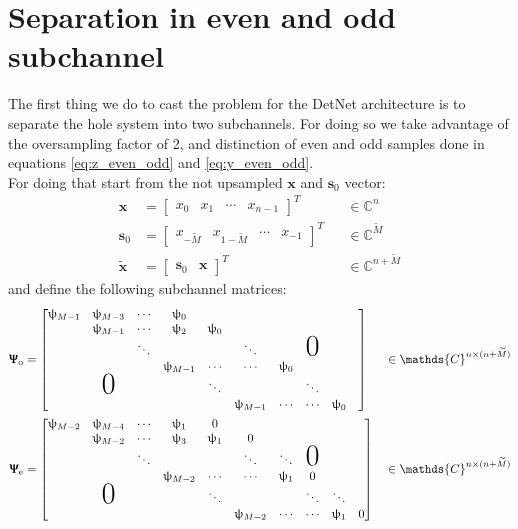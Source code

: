 \section{Separation in even and odd subchannel}

The first thing we do to cast the problem for the DetNet architecture is to separate the hole system into two subchannels. For doing so we take advantage of the oversampling factor of 2, and distinction of even and odd samples done in equations \ref{eq:z_even_odd} and \ref{eq:y_even_odd}.\\

For doing that start from the not upsampled $\bm x$ and $\bm s_0$ vector: 
\begin{align}
	\bm x &= \begin{bmatrix}x_0&x_1&\cdots& x_{n-1}\end{bmatrix}^T && \in \mathds{C}^{n}\\
	\bm{s}_0&=\begin{bmatrix}x_{-\widetilde{M}}&x_{1-\widetilde{M}}&\cdots&x_{-1}\end{bmatrix}^T && \in\mathds{C}^{\widetilde{M}}\\
	\bm \tilde{x} &= \begin{bmatrix}\bm s_0&\bm x\end{bmatrix}^T&&\in\mathds{C}^{n+\widetilde{M}}
\end{align}
and define the following subchannel matrices:
\begin{align}
	\bm \Uppsi_\text{o} &= \begin{bmatrix}
				\uppsi_{M-1}&\uppsi_{M-3}&\cdots &\uppsi_0&&&\\
				&\uppsi_{M-1}&\cdots &\uppsi_2&\uppsi_0&&\\
				&&\ddots&&&\ddots&&\mbox{\Huge 0}&\\
				&&&\uppsi_{M-1}&\cdots&\cdots&\uppsi_0&\\
				&\mbox{\Huge 0}&&&\ddots&&&\ddots&&\\
				&&&&&\uppsi_{M-1}&\cdots&\cdots&\uppsi_0&\\
			     \end{bmatrix}&&\in \mathds{C}^{n\times(n+\widetilde{M})}\\
	\bm \Uppsi_\text{e} &= \begin{bmatrix}
				\uppsi_{M-2}&\uppsi_{M-4}&\cdots &\uppsi_1&0&&\\
				&\uppsi_{M-2}&\cdots &\uppsi_3&\uppsi_1&0&\\
				&&\ddots&&&\ddots&\ddots&\mbox{\Huge 0}&\\
				&&&\uppsi_{M-2}&\cdots&\cdots&\uppsi_1&0\\
				&\mbox{\Huge 0}&&&\ddots&&&\ddots&\ddots&\\
				&&&&&\uppsi_{M-2}&\cdots&\cdots&\uppsi_1&0\\
			     \end{bmatrix}&&\in \mathds{C}^{n\times(n+\widetilde{M})}
\end{align}
